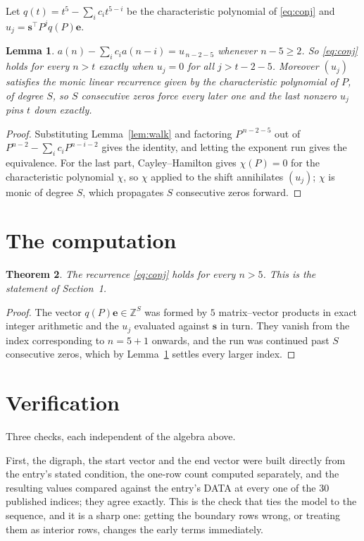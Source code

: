 \documentclass[11pt,a4paper]{article}
\theoremstyle{plain}
\newtheorem{theorem}{Theorem}
\newtheorem{lemma}[theorem]{Lemma}
\theoremstyle{definition}
\begin{document}
Let $q(t)=t^{5}-\sum_i c_i t^{5-i}$ be the characteristic polynomial of
\eqref{eq:conj} and $u_j=\mathbf{s}^{\!\top}P^{j}q(P)\mathbf{e}$.

\begin{lemma}\label{lem:crit}
$a(n)-\sum_i c_i a(n-i)=u_{\,n-2-5}$ whenever $n-5\ge2$. So \eqref{eq:conj}
holds for every $n>t$ exactly when $u_j=0$ for all $j>t-2-5$. Moreover $(u_j)$
satisfies the monic linear recurrence given by the characteristic polynomial of $P$, of
degree $S$, so $S$ consecutive zeros force every later one and the last nonzero $u_j$ pins
$t$ down exactly.
\end{lemma}

\begin{proof}
Substituting Lemma~\ref{lem:walk} and factoring $P^{\,n-2-5}$ out of
$P^{n-2}-\sum_i c_i P^{n-i-2}$ gives the identity, and letting the exponent run gives the
equivalence. For the last part, Cayley--Hamilton gives $\chi(P)=0$ for the characteristic
polynomial $\chi$, so $\chi$ applied to the shift annihilates $(u_j)$; $\chi$ is monic of
degree $S$, which propagates $S$ consecutive zeros forward.
\end{proof}

\section{The computation}

\begin{theorem}
The recurrence \eqref{eq:conj} holds for every $n>5$. This is the statement of
Section~1.
\end{theorem}

\begin{proof}
The vector $q(P)\mathbf{e}\in\mathbb{Z}^{S}$ was formed by $5$ matrix--vector
products in exact integer arithmetic and the $u_j$ evaluated against $\mathbf{s}$ in turn.
They vanish from the index corresponding to $n=5+1$ onwards, and the run was continued
past $S$ consecutive zeros, which by Lemma~\ref{lem:crit} settles every larger index.
\end{proof}

\section{Verification}

Three checks, each independent of the algebra above.

First, the digraph, the start vector and the end vector were built directly from the
entry's stated condition, the one-row count computed separately, and the resulting values
compared against the entry's DATA at every one of the $30$ published indices; they
agree exactly. This is the check that ties the model to the sequence, and it is a sharp one:
getting the boundary rows wrong, or treating them as interior rows, changes the early terms
immediately.
\end{document}

